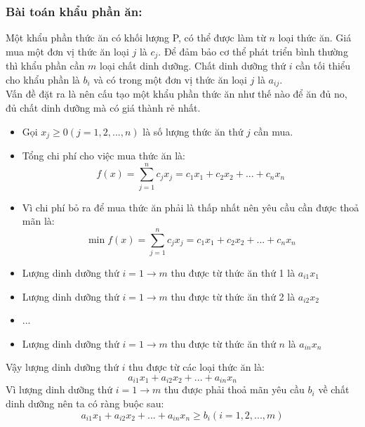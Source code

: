\documentclass{article}
\begin{document}
\subsubsection{Bài toán khẩu phần ăn:}
Một khẩu phần thức ăn có khối lượng P, có thể được làm từ $n$ loại thức ăn. Giá mua một đơn vị thức ăn loại $j$ là $c_j$. Để đảm bảo cơ thể phát triển bình thường thì khẩu phần cần $m$ loại chất dinh dưỡng. Chất dinh dưỡng thứ $i$ cần tối thiểu cho khẩu phần là $b_i$ và có trong một đơn vị thức ăn loại $j$ là $a_{ij}$.\medskip \\
Vấn đề đặt ra là nên cấu tạo một khẩu phần thức ăn như thế nào để ăn đủ no, đủ chất dinh dưỡng mà có giá thành rẻ nhất.
\begin{itemize}
    \item Gọi $x_j \geq 0 (j=1,2,...,n)$ là số lượng thức ăn thứ $j$ cần mua.
    \item Tổng chi phí cho việc mua thức ăn là: 
    \begin{equation*}
        f(x) =\sum_{j=1}^n c_jx_j = c_1x_1 + c_2x_2 + ... + c_nx_n
    \end{equation*}
    \item Vì chi phí bỏ ra để mua thức ăn phải là thấp nhất nên yêu cầu cần được thoả mãn là:
    \begin{equation*}
        \min{f(x)} =\sum_{j=1}^n c_jx_j = c_1x_1 + c_2x_2 + ... + c_nx_n
    \end{equation*}
\end{itemize}
\begin{itemize}
    \item Lượng dinh dưỡng thứ $i=1 \longrightarrow m$ thu được từ thức ăn thứ 1 là $a_{i1}x_1 $
    \item Lượng dinh dưỡng thứ $i=1 \longrightarrow m$  thu được từ thức ăn thứ 2 là $a_{i2}x_2 $
    \item ...
    \item Lượng dinh dưỡng thứ $i=1 \longrightarrow m$  thu được từ thức ăn thứ $n$ là $a_{in}x_n $
\end{itemize}
\hspace{0.4cm} Vậy lượng dinh dưỡng thứ $i$ thu được từ các loại thức ăn là:
\begin{equation*}
    a_{i1}x_1 + a_{i2}x_2 +...+ a_{in}x_n 
\end{equation*}
    Vì lượng dinh dưỡng thứ  $i=1 \longrightarrow m$ thu được phải thoả mãn yêu cầu $b_i$ về chất dinh dưỡng nên ta có ràng buộc sau:
\begin{equation*}
    a_{i1}x_1 + a_{i2}x_2 +...+ a_{in}x_n \geq b_i (i=1,2,...,m)
\end{equation*}
\end{document}
